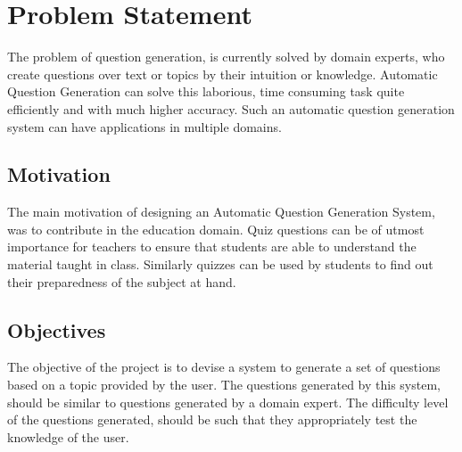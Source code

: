 \chapter{Problem Statement} 

The problem of question generation, is currently solved by domain experts, who
create questions over text or topics by their intuition or knowledge. Automatic
Question Generation can solve this laborious, time consuming task quite
efficiently and with much higher accuracy. Such an automatic question generation
system can have applications in multiple domains. 

\section{Motivation} 

The main motivation of designing an Automatic Question Generation System, was to
contribute in the education domain. Quiz questions can be of utmost
importance for teachers to ensure that students are able to understand the
material taught in class. Similarly quizzes can be used by students
to find out their preparedness of the subject at hand.

\section{Objectives}

The objective of the project is to devise a system to generate a set of questions based on a topic provided by the user. The
questions generated by this system, should be similar to questions
generated by a domain expert. The difficulty level of the questions generated, should
be such that they appropriately test the knowledge of the user. 

